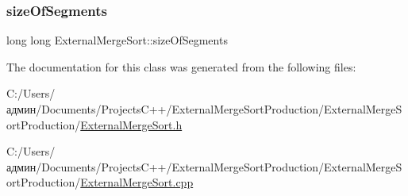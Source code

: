 \subsubsection{\texorpdfstring{size\+Of\+Segments}{sizeOfSegments}}
{\footnotesize\ttfamily long long External\+Merge\+Sort\+::size\+Of\+Segments\hspace{0.3cm}{\ttfamily [private]}}



The documentation for this class was generated from the following files\+:\begin{DoxyCompactItemize}
\item 
C\+:/\+Users/админ/\+Documents/\+Projects\+C++/\+External\+Merge\+Sort\+Production/\+External\+Merge\+Sort\+Production/\hyperlink{_external_merge_sort_8h}{External\+Merge\+Sort.\+h}\item 
C\+:/\+Users/админ/\+Documents/\+Projects\+C++/\+External\+Merge\+Sort\+Production/\+External\+Merge\+Sort\+Production/\hyperlink{_external_merge_sort_8cpp}{External\+Merge\+Sort.\+cpp}\end{DoxyCompactItemize}
